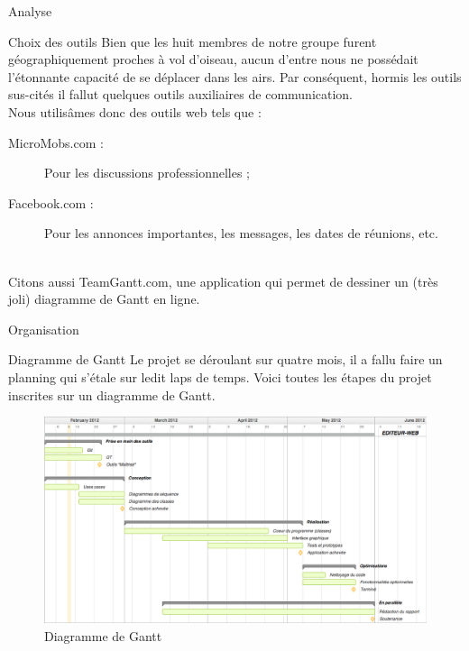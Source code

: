 \documentclass[a4paper, 12pt]{report}
\begin{document}
\begin{part}{Analyse}
\begin{chapter}{Choix des outils}
			Bien que les huit membres de notre groupe furent géographiquement proches à vol d'oiseau, aucun d'entre nous ne possédait l'étonnante
			capacité de se déplacer dans les airs. Par conséquent, hormis les outils sus-cités il fallut quelques outils auxiliaires de communication.
			\\
			Nous utilisâmes donc des outils web tels que :
			\begin{description}
				\item[MicroMobs.com :] Pour les discussions professionnelles ;
				\item[Facebook.com :] Pour les annonces importantes, les messages, les dates de réunions, etc.
			\end{description}~\\

			Citons aussi TeamGantt.com, une application qui permet de dessiner un (très joli) \gls{diagramme de Gantt} en ligne.
		\end{chapter}
		\begin{chapter}{Organisation}
			\begin{section}{Diagramme de Gantt}
				Le projet se déroulant sur quatre mois, il a fallu faire un planning qui s'étale sur ledit laps de temps.
				Voici toutes les étapes du projet inscrites sur un \gls{diagramme de Gantt}.
				\begin{figure}[h]
					\begin{center}
						\includegraphics[width=17cm]{images/DiagrammeGantt.png}
						\caption{Diagramme de Gantt}
						\label{flute}
					\end{center}
				\end{figure}~\\
			\end{section}
		\end{chapter}
	\end{part}
\end{document}
